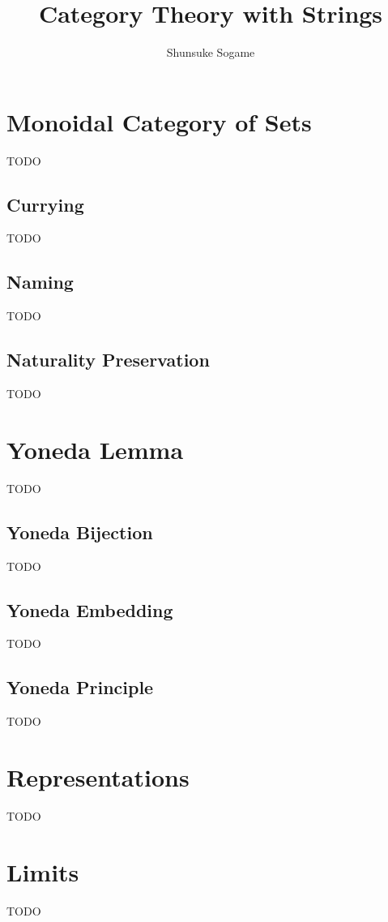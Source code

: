 \documentclass{article}
\title{Category Theory with Strings}
\author{Shunsuke Sogame}
\theoremstyle{break}
\numberwithin{theorem}{section}
\begin{document}
\maketitle











\section{Monoidal Category of Sets}

TODO
\subsection{Currying}

TODO
\subsection{Naming}

TODO
\subsection{Naturality Preservation}

TODO


\section{Yoneda Lemma}
TODO

\subsection{Yoneda Bijection}
TODO

\subsection{Yoneda Embedding}
TODO

\subsection{Yoneda Principle}
TODO

\section{Representations}
TODO

\section{Limits}
TODO
\end{document}
